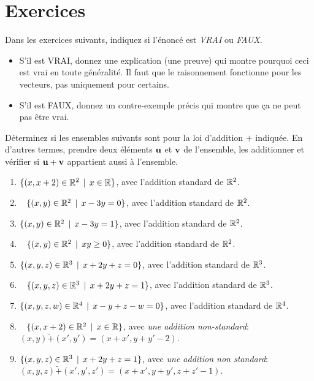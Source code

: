 \newpage
\section*{Exercices}

Dans les exercices suivants, indiquez si l'énoncé est {\emph{VRAI}} ou {\emph{FAUX}}. 
\begin{itemize}
\item S'il est VRAI, donnez une explication (une preuve) qui montre pourquoi ceci est vrai en toute généralité. Il faut que le raisonnement fonctionne pour  les vecteurs, pas uniquement pour certains.  
\item S'il est FAUX, donnez un contre-exemple précis qui montre que ça ne peut pas être vrai. 
\end{itemize}


\begin{prob} \label{prob04.1} Déterminez si les
ensembles suivants sont  pour la loi d'addition $+$ indiquée. En d'autres termes, prendre deux éléments $\mathbf{u}$ et $\mathbf{v}$ de l'ensemble, les additionner et vérifier si $\mathbf{u}+\mathbf{v}$ appartient aussi à l'ensemble.

\begin{enumerate}
\item
  $\{(x, x+2) \in \mathbb{R}^2\, \mid \, x\in \mathbb{R}\}$, avec l'addition standard de $\mathbb{R}^2$.
\item\sov~
  $\{(x, y) \in \mathbb{R}^2\, \mid \, x -3y=0 \}$, avec l'addition standard de   $\mathbb{R}^2$.
\item
  $\{(x, y) \in \mathbb{R}^2\, \mid \, x -3y=1 \}$, avec l'addition standard de
  $\mathbb{R}^2$.
\item\sov~
  $\{(x, y) \in \mathbb{R}^2\, \mid \, xy \ge 0 \}$, avec l'addition standard de $\mathbb{R}^2$.
\item
  $\{(x, y, z) \in \mathbb{R}^3\, \mid \, x+2y+z=0 \}$, avec l'addition standard de  $\mathbb{R}^3$.
\item\sov~
  $\{(x, y, z) \in \mathbb{R}^3\, \mid \, x+2y+z=1 \}$, avec l'addition standard de $\mathbb{R}^3$.
\item
  $\{(x, y, z, w) \in \mathbb{R}^4\, \mid \, x-y+z-w=0 \}$, avec l'addition standard de $\mathbb{R}^4$.
\item\sov~
  $\{(x, x+2) \in \mathbb{R}^2\, \mid \, x\in \mathbb{R}\}$, avec {\emph{une addition non-standard}}:
  $(x,y) \tilde+ (x',y')=(x+x', y+y'-2)$.
\item
  $\{(x, y, z) \in \mathbb{R}^3\, \mid \, x+2y+z=1 \}$, avec {\emph{une addition non standard}}:
  $(x,y,z) \tilde+ (x',y',z')=(x+x', y+y', z+z'-1)$.
\end{enumerate}
\end{prob}


